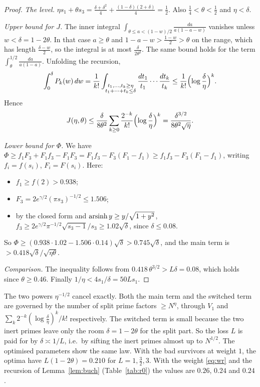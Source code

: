 \documentclass[11pt]{amsart}
\theoremstyle{remark}
\begin{document}
\begin{proof}
\emph{The level.} $\eta s_1+\theta s_3=\frac{\delta+\delta^2}4+\frac{(1-\delta)(2+\delta)}4=\frac12$. Also $\frac14<\theta<\frac12$ and $\eta<\delta$.

\emph{Upper bound for $J$.} The inner integral $\int_{\theta\le a<(1-w)/2}\frac{da}{a(1-a-w)}$ vanishes unless $w<\delta=1-2\theta$. In that case $a\ge\theta$ and $1-a-w>\frac{1-w}2>\theta$ on the range, which has length $\frac{\delta-w}2$, so the integral is at most $\frac{\delta}{2\theta^2}$. The same bound holds for the term $\int_\theta^{1/2}\frac{da}{a(1-a)}$. Unfolding the recursion,
\[
\int_0^\delta P_k(w)\,dw=\frac1{k!}\int_{\substack{t_1,\dots,t_k\ge\eta\\ t_1+\dots+t_k\le\delta}}\frac{dt_1}{t_1}\cdots\frac{dt_k}{t_k}\le\frac1{k!}\Bigl(\log\frac\delta\eta\Bigr)^k .
\]
Hence
\[
J(\eta,\theta)\le\frac{\delta}{8\theta^2}\sum_{k\ge0}\frac{2^{-k}}{k!}\Bigl(\log\frac\delta\eta\Bigr)^k=\frac{\delta^{3/2}}{8\theta^2\sqrt\eta}.
\]

\emph{Lower bound for $\Phi$.} We have $\Phi\ge f_1F_3+F_1f_3-F_1F_3=F_1f_3-F_3(F_1-f_1)\ge f_1f_3-F_3(F_1-f_1)$, writing $f_i=f(s_i)$, $F_i=F(s_i)$. Here:
\begin{itemize}[leftmargin=1.5em]
\item $f_1\ge f(2)>0.938$;
\item $F_3=2e^{\gamma/2}(\pi s_3)^{-1/2}\le1.506$;
\item by the closed form and ${\rm arsinh}\,y\ge y/\sqrt{1+y^2}$, $f_3\ge2e^{\gamma/2}\pi^{-1/2}\sqrt{s_3-1}/s_3\ge1.02\sqrt\delta$, since $\delta\le0.08$.
\end{itemize}
So $\Phi\ge(0.938\cdot1.02-1.506\cdot0.14)\sqrt\delta>0.745\sqrt\delta$, and the main term is $>0.418\sqrt\delta/\sqrt{\eta\theta}$.

\emph{Comparison.} The inequality follows from $0.418\,\theta^{3/2}>L\delta=0.08$, which holds since $\theta\ge0.46$. Finally $1/\eta<4s_1/\delta=50Ls_1$.
\end{proof}

The two powers $\eta^{-1/2}$ cancel exactly. Both the main term and the switched term are governed by the number of split prime factors $\ge N^\eta$, through $V_1$ and $\sum_k2^{-k}(\log\frac\delta\eta)^k/k!$ respectively. The switched term is small because the two inert primes leave only the room $\delta=1-2\theta$ for the split part. So the loss $L$ is paid for by $\delta\asymp1/L$, i.e.\ by sifting the inert primes almost up to $N^{1/2}$. The optimised parameters show the same law. With the bad survivors at weight $1$, the optima have $L(1-2\theta)=0.210$ for $L=1,\frac32,3$. With the weight \eqref{eq:wr} and the recursion of Lemma~\ref{lem:buch} (Table~\ref{tab:r0}) the values are $0.26$, $0.24$ and $0.24$.
\end{document}
